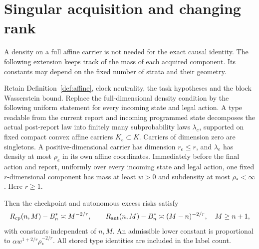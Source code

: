 \section{Singular acquisition and changing rank}\label{sec:strata}
A density on a full affine carrier is not needed for the exact causal identity. The following extension keeps track of the mass of each acquired component. Its constants may depend on the fixed number of strata and their geometry.

\begin{theorem}\label{thm:strata}
Retain Definition~\ref{def:affine}, clock neutrality, the task hypotheses and the block Wasserstein bound. Replace the full-dimensional density condition by the following uniform statement for every incoming state and legal action. A type readable from the current report and incoming programmed state decomposes the actual post-report law into finitely many subprobability laws $\lambda_e$, supported on fixed compact convex affine carriers $K_e\subset K$. Carriers of dimension zero are singletons. A positive-dimensional carrier has dimension $r_e\le r$, and $\lambda_e$ has density at most $\rho_e$ in its own affine coordinates. Immediately before the final action and report, uniformly over every incoming state and legal action, one fixed $r$-dimensional component has mass at least $w>0$ and subdensity at most $\rho_*<\infty$. Here $r\ge1$.

Then the checkpoint and autonomous excess risks satisfy
\[
 R_{\mathrm{cp}}(n,M)-B_n^*\asymp M^{-2/r},\qquad
 R_{\mathrm{aut}}(n,M)-B_n^*\asymp(M-n)^{-2/r},\quad M\ge n+1,
\]
with constants independent of $n,M$. An admissible lower constant is proportional to $\alpha w^{1+2/r}\rho_*^{-2/r}$. All stored type identities are included in the label count.
\end{theorem}
